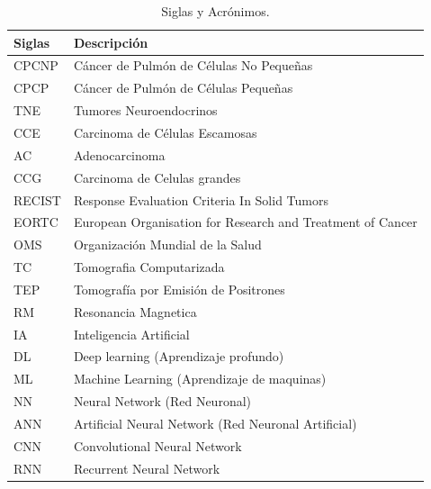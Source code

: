 \documentclass[11pt,a4paper,openany]{article}
\begin{document}
\begin{table}[h]
    \centering
    \caption{Siglas y Acrónimos.}
     \vspace{0.3cm}
    \begin{tabular}{ p{3cm} p{12cm} }
        Siglas & Descripción \\ \hline 
        CPCNP & Cáncer de Pulmón de Células No Pequeñas \\ 
        CPCP & Cáncer de Pulmón de Células Pequeñas \\ 
        TNE & Tumores Neuroendocrinos\\
        CCE & Carcinoma de Células Escamosas\\
        AC & Adenocarcinoma\\
        CCG & Carcinoma de Celulas grandes\\
        RECIST & Response Evaluation Criteria In Solid Tumors \\ 
        EORTC & European Organisation for Research and Treatment of Cancer  \\ 
        OMS & Organización Mundial de la Salud  \\ 
        TC  & Tomografia Computarizada\\ 
        TEP  & Tomografía por Emisión de Positrones\\
        RM  & Resonancia Magnetica \\ 
        IA  & Inteligencia Artificial\\
        DL  & Deep learning (Aprendizaje profundo)\\
        ML  & Machine Learning (Aprendizaje de maquinas)\\
        NN  & Neural Network (Red Neuronal) \\
        ANN  & Artificial Neural Network (Red Neuronal Artificial) \\
        CNN  & Convolutional Neural Network \\ 
        RNN  & Recurrent Neural Network \\ 
    \end{tabular}
\end{table}

\newpage
\end{document}
